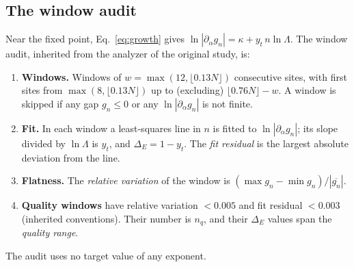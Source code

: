 \documentclass[10pt,a4paper]{article}
\newcommand{\DE}{\Delta_E}
\newcommand{\nq}{n_q}
\begin{document}
\subsection{The window audit}\label{sec:windows}
Near the fixed point, Eq.~\eqref{eq:growth} gives $\ln|\partial_\alpha g_n|=\kappa+y_t\,n\ln\Lambda$. The window audit, inherited from
the analyzer of the original study, is:
\begin{enumerate}
\item \textbf{Windows.} Windows of $w=\max(12,\lfloor0.13N\rfloor)$ consecutive sites, with first sites from $\max(8,\lfloor0.13N\rfloor)$
  up to (excluding) $\lfloor0.76N\rfloor-w$. A window is skipped if any gap $g_n\le0$ or any $\ln|\partial_\alpha g_n|$ is not finite.
\item \textbf{Fit.} In each window a least-squares line in $n$ is fitted to $\ln|\partial_\alpha g_n|$; its slope divided by $\ln\Lambda$
  is $y_t$, and $\DE=1-y_t$. The \emph{fit residual} is the largest absolute deviation from the line.
\item \textbf{Flatness.} The \emph{relative variation} of the window is $(\max g_n-\min g_n)/|\overline{g_n}|$.
\item \textbf{Quality windows} have relative variation $<0.005$ and fit residual $<0.003$ (inherited conventions). Their number is
  $\nq$, and their $\DE$ values span the \emph{quality range}.
\end{enumerate}
The audit uses no target value of any exponent.
\end{document}
